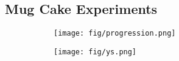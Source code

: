 \subsection{Mug Cake Experiments}

\begin{figure}
     \centering
     \begin{subfigure}[b]{0.45\textwidth}
         \centering
         \texttt{[image: fig/progression.png]}
         \caption{}
     \end{subfigure}
     \hfill
     \begin{subfigure}[b]{0.45\textwidth}
         \centering
         \texttt{[image: fig/ys.png]}
         \caption{}
     \end{subfigure}
     \hfill
    \caption{
    }
\end{figure}

